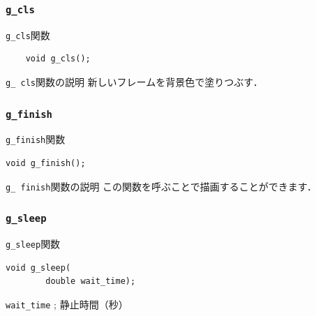\documentclass[a4paper,12pt]{jsarticle}%
\begin{document}

\subsubsection{\texttt{g\_cls}}

\begin{itembox}[l]{\texttt{g\_cls}関数}
	\begin{verbatim}
	void g_cls();
	\end{verbatim}
\end{itembox}

\begin{itembox}[l]{\texttt{g\_ cls}関数の説明}
	新しいフレームを背景色で塗りつぶす．
\end{itembox}


\clearpage
\subsubsection{\texttt{g\_finish}}

\begin{itembox}[l]{\texttt{g\_finish}関数}
\begin{verbatim}
void g_finish();
\end{verbatim}
\end{itembox}

\begin{itembox}[l]{\texttt{g\_ finish}関数の説明}
この関数を呼ぶことで描画することができます．
\end{itembox}


\subsubsection{\texttt{g\_sleep}}

\begin{itembox}[l]{\texttt{g\_sleep}関数}
\begin{verbatim}
void g_sleep(
        double wait_time);
\end{verbatim}
\verb|wait_time| ; 静止時間（秒）\\
\end{itembox}
\end{document}
